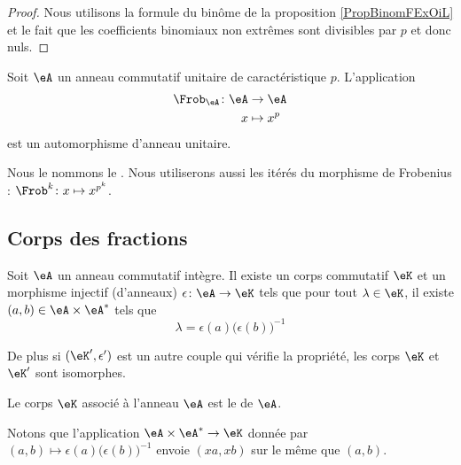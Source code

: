 \begin{proof}
    Nous utilisons la formule du binôme de la proposition \ref{PropBinomFExOiL} et le fait que les coefficients binomiaux non extrêmes sont divisibles par \( p\) et donc nuls.
\end{proof}

\begin{proposition} \label{PropFrobHAMkTY}
    Soit \( \eA\) un anneau commutatif unitaire de caractéristique \( p\). L'application
    \begin{equation}
        \begin{aligned}
            \Frob_\eA\colon \eA&\to \eA \\
            x&\mapsto x^p 
        \end{aligned}
    \end{equation}
    est un automorphisme d'anneau unitaire.
\end{proposition}
Nous le nommons le . Nous utiliserons aussi les itérés du morphisme de Frobenius : \( \Frob^k\colon x\mapsto x^{p^k}\).

\subsection{Corps des fractions}

\begin{theorem}     \label{ThogbhWgo}
    Soit \( \eA\) un anneau commutatif intègre. Il existe un corps commutatif \( \eK\) et un morphisme injectif (d'anneaux) \( \epsilon\colon \eA\to \eK\) tels que pour tout \( \lambda\in\eK\), il existe \( (a,b)\in \eA\times \eA^*\) tels que
    \begin{equation}
        \lambda=\epsilon(a)\big( \epsilon(b) \big)^{-1}
    \end{equation}

    De plus si \( (\eK',\epsilon')\) est un autre couple qui vérifie la propriété, les corps \( \eK\) et \( \eK'\) sont isomorphes.
\end{theorem}
Le corps \( \eK\) associé à l'anneau \( \eA\) est le  de \( \eA\).

Notons que l'application \( \eA\times \eA^*\to \eK\) donnée par \( (a,b)\mapsto \epsilon(a)\big( \epsilon(b) \big)^{-1}\) envoie \( (xa,xb)\) sur le même que \( (a,b)\).

